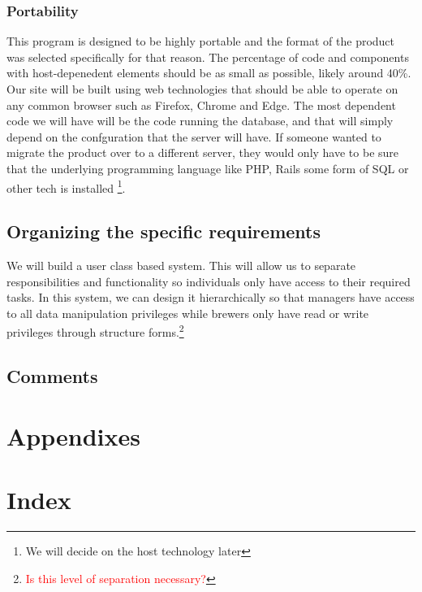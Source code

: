 \documentclass[draftclsnofoot,onecolumn,letterpaper,10pt,compsoc]{IEEEtran}
\newcommand\question[1]{\footnote{\textcolor{red}{#1}}}
\begin{document}
		\subsubsection{Portability}

		This program is designed to be highly portable and the format of the product was selected specifically for that reason.
		The percentage of code and components with host-depenedent elements should be as small as possible, likely around 40\%.
		Our site will be built using web technologies that should be able to operate on any common browser such as Firefox, Chrome and Edge.
		The most dependent code we will have will be the code running the database, and that will simply depend on the confguration that the server will have.
		If someone wanted to migrate the product over to a different server, they would only have to be sure that the underlying programming language like PHP, Rails some form of SQL or other tech is installed
		\footnote{We will decide on the host technology later}.

	\subsection{Organizing the specific requirements}
		We will build a user class based system. This will allow us to separate responsibilities and functionality so individuals only have access to their required tasks. In this system, we can design it hierarchically so that managers have access to all data manipulation privileges while brewers only have read or write privileges through structure forms.\question{Is this level of separation necessary?}
	\subsection{Comments}
\section{Appendixes}
\section{Index}

\pagebreak

\end{document}
